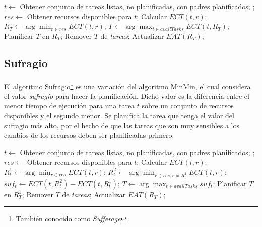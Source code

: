 \begin{algorithmic}[1]
	\State $t \gets$ Obtener conjunto de tareas listas, no planificadas, con padres planificados;
	\State {};
\EndWhile
{}
			\State $res \gets$ Obtener recursos disponibles para $t$;
				\State Calcular $ECT(t,r)$;
			\EndFor
			\State $R_T \gets \arg\min_{r \in res}ECT(t,r)$;
		\EndFor
		\State $T \gets \arg\max_{t \in availTasks}ECT(t,R_T)$;
		\State Planificar $T$ en $R_T$;
		\State Remover $T$ de \emph{tareas};
		\State Actualizar $EAT(R_T)$;
	\EndWhile
\EndProcedure
\end{algorithmic}

\subsection{Sufragio}
\label{alg:sufferage}
El algoritmo Sufragio\footnote{También conocido como \emph{Sufferage}} \cite{maheswaran1999dynamic} es una variación del algoritmo MinMin, el cual considera el valor \emph{sufragio} para hacer la planificación. Dicho valor es la diferencia entre el menor tiempo de ejecución para una tarea $t$ sobre un conjunto de recursos disponibles y el segundo menor. Se planifica la tarea que tenga el valor del sufragio más alto, por el hecho de que las tareas que son muy sensibles a los cambios de los recursos deben ser planificadas primero. 

\begin{algorithmic}[1]
	\State $t \gets$ Obtener conjunto de tareas listas, no planificadas, con padres planificados;
	\State {};
\EndWhile
{}
			\State $res \gets$ Obtener recursos disponibles para $t$;
				\State Calcular $ECT(t,r)$;
			\EndFor
			\State $R^1_t \gets \arg\min_{r \in res}ECT(t,r)$;
			\State $R^2_t \gets \arg\min_{r \in res, r \ne{R^1_t}}ECT(t,r)$;
			\State $suf_t \gets ECT(t,R^2_t) - ECT(t,R^1_t)$;
		\EndFor
		\State $T \gets \arg\max_{t \in availTasks}suf_t$;
		\State Planificar $T$ en $R^1_T$;
		\State Remover $T$ de \emph{tareas};
		\State Actualizar $EAT(R_T)$;
	\EndWhile
\EndProcedure
\end{algorithmic}


